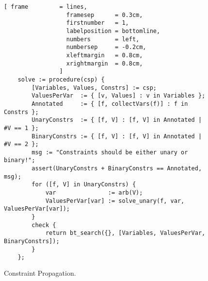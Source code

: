 \begin{figure}[!ht]
\centering
\begin{Verbatim}[ frame         = lines, 
                  framesep      = 0.3cm, 
                  firstnumber   = 1,
                  labelposition = bottomline,
                  numbers       = left,
                  numbersep     = -0.2cm,
                  xleftmargin   = 0.8cm,
                  xrightmargin  = 0.8cm,
                ]
    solve := procedure(csp) {
        [Variables, Values, Constrs] := csp;
        ValuesPerVar  := { [v, Values] : v in Variables };
        Annotated     := { [f, collectVars(f)] : f in Constrs };
        UnaryConstrs  := { [f, V] : [f, V] in Annotated | #V == 1 };
        BinaryConstrs := { [f, V] : [f, V] in Annotated | #V == 2 };
        msg := "Constraints should be either unary or binary!";
        assert(UnaryConstrs + BinaryConstrs == Annotated, msg); 
        for ([f, V] in UnaryConstrs) {
            var               := arb(V);
            ValuesPerVar[var] := solve_unary(f, var, ValuesPerVar[var]);
        }
        check {
            return bt_search({}, [Variables, ValuesPerVar, BinaryConstrs]);
        }
    };
\end{Verbatim}
\vspace*{-0.3cm}
\caption{Constraint Propagation.}
\label{fig:csp-constraint-propagation.stlx-1}
\end{figure}

